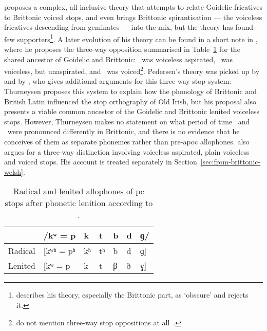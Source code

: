 \Textcite{Ped_Aspirationen97} proposes a complex, all-inclusive theory that attempts  to relate  Goidelic  fricatives to Brittonic voiced stops, and even brings Brittonic spirantisation — the voiceless fricatives descending from geminates — into the mix, but the theory has found few supporters\footnote{\Textcite{Str_Erschienene99} describes his theory, especially the Brittonic part, as `obscure' and rejects it.}. A later evolution of his theory can be found in a short note in  \textcite[§§~149,~303]{Ped_Vergleichende09}, where he proposes the  three-way opposition summarised in Table~\ref{tab:pedersenstops} for the shared ancestor of Goidelic and Brittonic: \xT\ was voiceless aspirated, \lT\ was voiceless, but unaspirated, and \xD\ was voiced\footnote{\Textcite{LP_Concise37} do not mention three-way stop oppositions at all~\autocite[§~131]{jackson_language_1953}.}.
Pedersen's theory was picked up by \textcite[§~245]{Bau_Grammar24} and by \textcite[§~915]{Thu_grammar46}, who gives additional arguments for this three-way stop system:
Thurneysen proposes this system  to explain how the phonology of Brittonic and British Latin influenced the stop orthography of Old Irish, but his proposal also presents  a viable common ancestor of the Goidelic and Brittonic lenited voiceless stops. However, Thurneysen makes no statement on what period of time  \lT\ and \xD\ were pronounced differently in Brittonic, and there is no evidence that he conceives of them as separate \gls{phoneme}s rather than pre-\gls{apoc} allophones. \Textcite{koch_*cothairche_1990} also argues for a three-way distinction involving voiceless aspirated, plain voiceless and voiced stops. His account is treated separately in Section~\ref{sec:from-brittonic-welsh}.

\begin{table}[h]
  \centering
  \caption{Radical and lenited allophones of \gls{pc} stops after phonetic lenition according to \textcite[§§~149,~303]{Ped_Vergleichende09}.}
  \label{tab:pedersenstops}
  \begin{tabular}{lllllll}
    \toprule
    &/kʷ = p & k & t & b & d & ɡ/ \\\midrule
    Radical &[kʷʰ = pʰ& kʰ& tʰ& b & d & ɡ] \\ 
    Lenited &[kʷ = p & k & t & β & ð & ɣ]\\
    \bottomrule
  \end{tabular}
\end{table}



